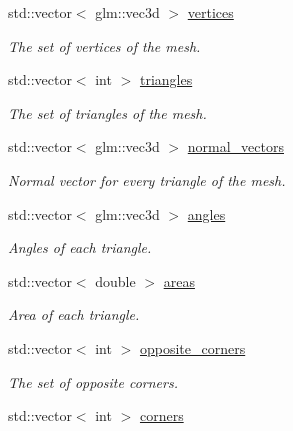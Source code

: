 \begin{DoxyCompactItemize}
\item 
\mbox{\label{classgeoproc_1_1TriangleMesh_a72052fc497d349c48966b937e5e3e834}} 
std\+::vector$<$ glm\+::vec3d $>$ \hyperlink{classgeoproc_1_1TriangleMesh_a72052fc497d349c48966b937e5e3e834}{vertices}
\begin{DoxyCompactList}\small\item\em The set of vertices of the mesh. \end{DoxyCompactList}\item 
std\+::vector$<$ int $>$ \hyperlink{classgeoproc_1_1TriangleMesh_ad1cf20622f2bb080100862f413bd89c2}{triangles}
\begin{DoxyCompactList}\small\item\em The set of triangles of the mesh. \end{DoxyCompactList}\item 
std\+::vector$<$ glm\+::vec3d $>$ \hyperlink{classgeoproc_1_1TriangleMesh_a9fa270e81bcf0b9acf03696d9d0c9264}{normal\+\_\+vectors}
\begin{DoxyCompactList}\small\item\em Normal vector for every triangle of the mesh. \end{DoxyCompactList}\item 
std\+::vector$<$ glm\+::vec3d $>$ \hyperlink{classgeoproc_1_1TriangleMesh_a50b5456f546551aa39d68487614d7720}{angles}
\begin{DoxyCompactList}\small\item\em Angles of each triangle. \end{DoxyCompactList}\item 
std\+::vector$<$ double $>$ \hyperlink{classgeoproc_1_1TriangleMesh_a134859a7251c2ae7c8b64b2e44e8ad0e}{areas}
\begin{DoxyCompactList}\small\item\em Area of each triangle. \end{DoxyCompactList}\item 
std\+::vector$<$ int $>$ \hyperlink{classgeoproc_1_1TriangleMesh_a2604795c90c694116513252b86d242b4}{opposite\+\_\+corners}
\begin{DoxyCompactList}\small\item\em The set of opposite corners. \end{DoxyCompactList}\item 
std\+::vector$<$ int $>$ \hyperlink{classgeoproc_1_1TriangleMesh_ab9610d614e081deb28010d237fecd55b}{corners}

\end{DoxyCompactItemize}
